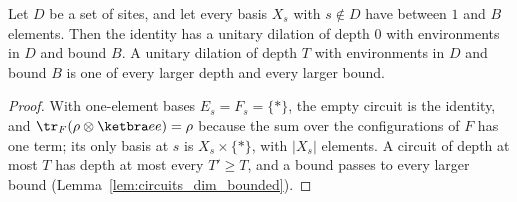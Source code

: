 \begin{lemma}
    \label{lem:protocols_dilation_id}
    \leanok
    Let $D$ be a set of sites, and let every basis $X_s$ with $s\notin D$ have between $1$ and
    $B$ elements. Then the identity has a unitary dilation of depth $0$ with environments in $D$
    and bound $B$. A unitary dilation of depth $T$ with environments in $D$ and bound $B$ is one
    of every larger depth and every larger bound.
\end{lemma}
\begin{proof}\leanok
    With one-element bases $E_s=F_s=\{*\}$, the empty circuit is the identity, and
    $\tr_F(\rho\otimes\ketbra ee)=\rho$ because the sum over the configurations of $F$ has
    one term; its only basis at $s$ is $X_s\times\{*\}$, with $\lvert X_s\rvert$ elements. A
    circuit of depth at most $T$ has depth at most every $T'\geq T$, and a bound passes to every
    larger bound (Lemma~\ref{lem:circuits_dim_bounded}).
\end{proof}

